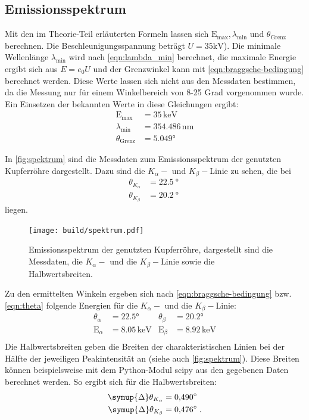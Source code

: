 \subsection{Emissionsspektrum}
Mit den im Theorie-Teil erläuterten Formeln lassen sich $\text{E}_\text{max}, \lambda_\text{min}$ und $\theta_\text{Grenz}$ berechnen. Die Beschleunigungsspannung beträgt $U=35 \si{\kilo\volt}$). Die minimale Wellenlänge $\lambda_\text{min}$ wird nach \autoref{eqn:lambda_min} berechnet, die maximale Energie ergibt sich aus $E = e_0 U$ und der Grenzwinkel kann mit \autoref{eqn:braggsche-bedingung} berechnet werden. Diese Werte lassen sich nicht aus den Messdaten bestimmen, da die Messung nur für einem Winkelbereich von 8-25 Grad vorgenommen wurde. Ein Einsetzen der bekannten Werte in diese Gleichungen ergibt:
\begin{align}
  \text{E}_\text{max} &= 35 \, \mathrm{keV}\\
  \lambda_\text{min} &= 354.486 \, \mathrm{nm}\\
  \theta_\text{Grenz} &= 5.049°
\end{align}

In \autoref{fig:spektrum} sind die Messdaten zum Emissionsspektrum der genutzten Kupferröhre dargestellt. Dazu sind die $K_\alpha-$ und $K_\beta-$Linie zu sehen, die bei
\begin{align*}
    \theta_{K_\alpha} &= \SI{22.5}{\degree} \\
    \theta_{K_\beta}  &= \SI{20.2}{\degree} \; 
\end{align*}
liegen.
\begin{figure}[H]
  \centering
  \texttt{[image: build/spektrum.pdf]}
  \caption{Emissionsspektrum der genutzten Kupferröhre, dargestellt sind die Messdaten, die $K_\alpha-$ und die $K_\beta-$Linie sowie die Halbwertsbreiten.}
  \label{fig:spektrum}
\end{figure}
\noindent
Zu den ermittelten Winkeln ergeben sich nach \autoref{eqn:braggsche-bedingung} bzw. \autoref{eqn:theta} folgende Energien für die $K_\alpha-$ und die $K_\beta-$Linie:
\begin{align}
  \theta_\alpha&=22.5° & \theta_\beta&=20.2° \\
  \text{E}_\alpha&=8.05 \, \mathrm{keV}   &\text{E}_\beta&=8.92 \, \mathrm{keV} \\
\end{align}
  Die Halbwertsbreiten geben die Breiten der charakteristischen Linien bei der Hälfte der jeweiligen Peakintensität an (siehe auch \autoref{fig:spektrum}). Diese Breiten können beispielsweise mit dem Python-Modul scipy aus den gegebenen Daten berechnet werden. So ergibt sich für die Halbwertsbreiten:
\begin{align}
  \symup{\Delta}\theta_{K_\alpha} &= \SI{0.490}{\degree} \\
  \symup{\Delta}\theta_{K_\beta}  &= \SI{0.476}{\degree} \; .
\end{align}



